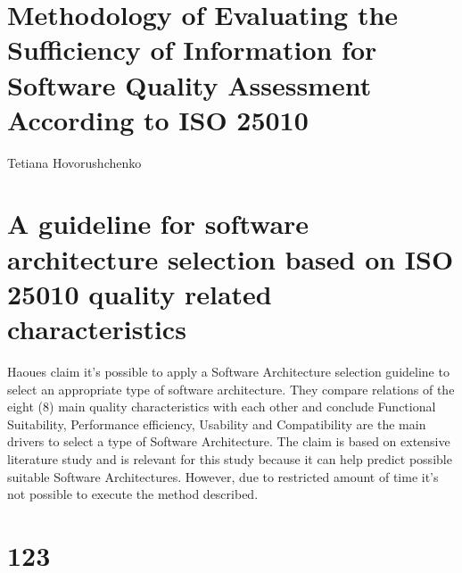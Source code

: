 \section*{Methodology of Evaluating the Sufficiency of Information for Software Quality Assessment According to ISO 25010}
Tetiana Hovorushchenko \cite{Hovorushchenko2018MethodologyOE}

\section*{A guideline for software architecture selection based on ISO 25010 quality related characteristics}
Haoues \etal \cite{Haoues2017AGF} claim it's possible to apply a Software Architecture selection guideline to select an appropriate type of software architecture. They compare relations of the eight (8) main quality characteristics with each other and conclude Functional Suitability, Performance efficiency, Usability and Compatibility are the main drivers to select a type of Software Architecture. The claim is based on extensive literature study and is relevant for this study because it can help predict possible suitable Software Architectures. However, due to restricted amount of time it's not possible to execute the method described. 

\section*{123}
\lipsum[1]